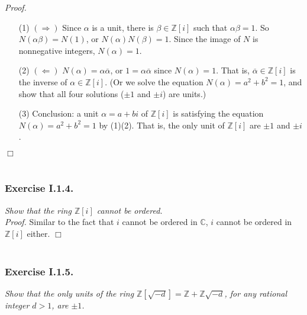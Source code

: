 \documentclass{article}
\begin{document}
\emph{Proof.}
\begin{enumerate}
\item[(1)]
  \emph{$(\Longrightarrow)$}
  Since $\alpha$ is a unit, there is $\beta \in \mathbb{Z}[i]$ such that
  $\alpha \beta = 1$.
  So $N(\alpha \beta) = N(1)$, or $N(\alpha) N(\beta) = 1$.
  Since the image of $N$ is nonnegative integers, $N(\alpha) = 1$.

\item[(2)]
  \emph{$(\Longleftarrow)$}
  $N(\alpha) = \alpha \overline{\alpha}$,
  or $1 = \alpha \overline{\alpha}$ since $N(\alpha) = 1$.
  That is, $\overline{\alpha} \in \mathbb{Z}[i]$ is
  the inverse of $\alpha \in \mathbb{Z}[i]$.
  (Or we solve the equation $N(\alpha) = a^2 + b^2 = 1$,
  and show that all four solutions ($\pm 1$ and $\pm i$) are units.)

\item[(3)]
  Conclusion: a unit $\alpha = a+bi$ of $\mathbb{Z}[i]$
  is satisfying the equation $N(\alpha) = a^2 + b^2 = 1$ by (1)(2).
  That is, the only unit of $\mathbb{Z}[i]$ are $\pm 1$ and $\pm i$.
\end{enumerate}
$\Box$ \\\\






\subsubsection*{Exercise I.1.4.}
\emph{Show that the ring $\mathbb{Z}[i]$ cannot be ordered.} \\



\emph{Proof.}
  Similar to the fact that $i$ cannot be ordered in $\mathbb{C}$,
  $i$ cannot be ordered in $\mathbb{Z}[i]$ either.
$\Box$ \\\\






\subsubsection*{Exercise I.1.5.}
\emph{Show that the only units of the ring $\mathbb{Z}[\sqrt{-d}] = \mathbb{Z} + \mathbb{Z}\sqrt{-d}$,
for any rational integer $d > 1$, are $\pm 1$.} \\
\end{document}
